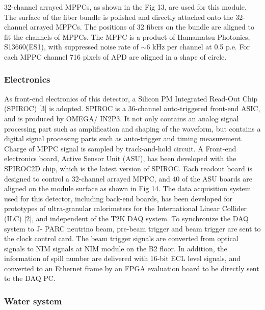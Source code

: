 32-channel arrayed MPPCs, as shown in the Fig 13, are used for this module. The surface of the fiber bundle is polished and directly attached onto the 32-channel arrayed MPPCs. The positions of 32 fibers on the bundle are aligned to fit the channels of MPPCs. The MPPC is a product of Hamamatsu Photonics, S13660(ES1), with suppressed noise rate of $\sim$6 kHz per channel at 0.5 p.e. For each MPPC channel 716 pixels of APD are aligned in a shape of circle.


\subsubsection{Electronics}
As front-end electronics of this detector, a Silicon PM Integrated Read-Out Chip (SPIROC) [3] is adopted.
SPIROC is a 36-channel auto-triggered front-end ASIC, and is produced by OMEGA/ IN2P3. 
It not only contains an analog signal processing part such as amplification and shaping of the waveform, but contains a digital signal processing parts such as auto-trigger and timing measurement.
Charge of MPPC signal is sampled by track-and-hold circuit.
A Front-end electronics board, Active Sensor Unit (ASU), has been developed with the SPIROC2D chip, which is the latest version of SPIROC. 
Each readout board is designed to control a 32-channel arrayed MPPC, and 40 of the ASU boards are aligned on the module surface as shown in Fig 14. 
The data acquisition system used for this detector, including back-end boards, has been developed for prototypes of ultra-granular calorimeters for the International Linear Collider (ILC) [2], and independent of the T2K DAQ system.
To synchronize the DAQ system to J- PARC neutrino beam, pre-beam trigger and beam trigger are sent to the clock control card.
The beam trigger signals are converted from optical signals to NIM signals at NIM module on the B2 floor.
In addition, the information of spill number are delivered with 16-bit ECL level signals, and converted to an Ethernet frame by an FPGA evaluation board to be directly sent to the DAQ PC.

\subsubsection{Water system}


